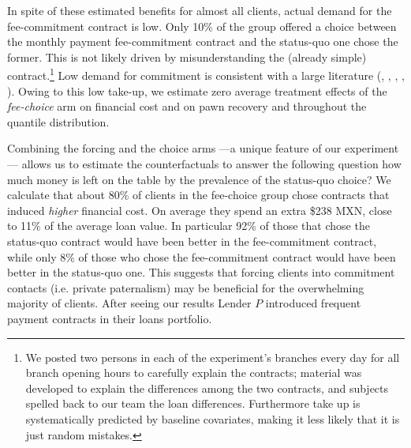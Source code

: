 \documentclass[oneside,11pt]{article}
\begin{document}
In spite of these estimated benefits for almost all clients, actual demand for the fee-commitment contract is low. Only 10\% of the group offered a choice between the monthly payment fee-commitment contract and the status-quo one chose the former. This is not likely driven by misunderstanding the (already simple) contract.\footnote{We posted two persons in each of the experiment's branches every day for all branch opening hours to carefully explain the contracts; material was developed to explain the differences among the two contracts, and subjects spelled back to our team the loan differences. Furthermore take up is systematically predicted by baseline covariates, making it less likely that it is just random mistakes.} Low demand for commitment is consistent with a large literature (\cite{Laibson2015}, \cite{Laibson2018}, \cite{John}, \cite{Ted}, \cite{Rabin2018}). 
Owing to this low take-up, we estimate zero average treatment effects of the \textit{fee-choice} arm on financial cost and on pawn recovery and throughout the quantile distribution.


Combining the forcing and the choice arms ---a unique feature of our experiment--- allows us to estimate the counterfactuals to answer the following question how much money is left on the table by the prevalence of the status-quo choice? We calculate that about 80\% of clients in the fee-choice group chose contracts that induced \textit{higher} financial cost. On average they spend an extra \$238 MXN, close to 11\% of the average loan value. In particular 92\% of those that chose the status-quo contract would have been better in the fee-commitment contract, while only 8\% of those who chose the fee-commitment contract would have been better in the status-quo one. This suggests that forcing clients into commitment contacts (i.e. private paternalism) may be beneficial for the overwhelming majority of clients. After seeing our results Lender $P$ introduced frequent payment contracts in their loans portfolio.
\end{document}
